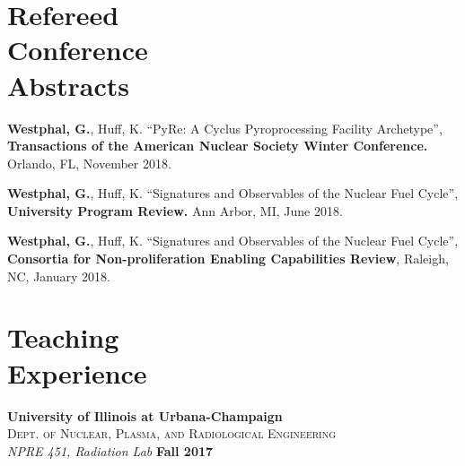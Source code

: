 \documentclass[margin,line]{resume}
\begin{document}
\begin{resume}
    \section{\mysidestyle Refereed\\Conference\\Abstracts}
    \begin{bibenum} 
    \item \textbf{Westphal, G.}, Huff, K. ``PyRe: A Cyclus Pyroprocessing Facility Archetype'', 
            \textbf{Transactions of the American Nuclear Society Winter Conference.} 
            Orlando, FL, November 2018.  
    \item \textbf{Westphal, G.}, Huff, K. ``Signatures and Observables of the Nuclear Fuel Cycle'', 
            \textbf{University Program Review.} 
            Ann Arbor, MI, June 2018.
    \item \textbf{Westphal, G.}, Huff, K. ``Signatures and Observables of the Nuclear Fuel Cycle'', 
    		\textbf{Consortia for Non-proliferation Enabling Capabilities Review}, 
    		Raleigh, NC, January 2018.
    \end{bibenum}
      
    \section{\mysidestyle Teaching\\Experience}
    \textbf{University of Illinois at Urbana-Champaign}\\
    \textsc{Dept. of Nuclear, Plasma, and Radiological Engineering}\\ 
               \textsl{NPRE 451, Radiation Lab} \hfill \textbf{Fall 2017}\\
    

\end{resume}
\end{document}
